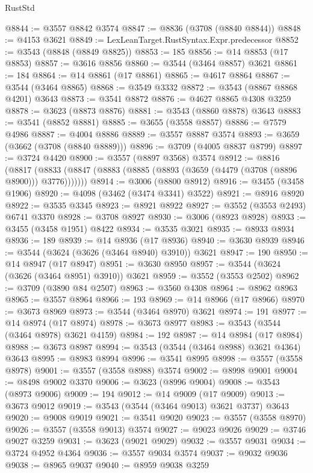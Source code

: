 \begin{lexlean}{RustStd}
\begin{coremodule}
@8844 := @3557 @8842 @3574
@8847 := @8836 (@3708 (@8840 @8844))
@8848 := @4153 @3621
@8849 := LexLeanTarget.RustSyntax.Expr.predecessor
@8852 := @3543 (@8848 (@8849 @8825))
@8853 := 185
@8856 := @14 @8853 (@17 @8853)
@8857 := @3616 @8856
@8860 := @3544 (@3464 @8857) @3621
@8861 := 184
@8864 := @14 @8861 (@17 @8861)
@8865 := @4617 @8864
@8867 := @3544 (@3464 @8865)
@8868 := @3549 @3332
@8872 := @3543 (@8867 @8868 @4201) @3643
@8873 := @3541 @8872
@8876 := @4627 @8865 @4308 @3259
@8878 := @3623 (@8873 @8876)
@8881 := @3543 (@8860 @8878) @3643
@8883 := @3541 (@8852 @8881)
@8885 := @3655 (@3558 @8857)
@8886 := @7579 @4986
@8887 := @4004 @8886
@8889 := @3557 @8887 @3574
@8893 := @3659 (@3662 (@3708 (@8840 @8889)))
@8896 := @3709 (@4005 @8837 @8799)
@8897 := @3724 @4420
@8900 := @3557 (@8897 @3568) @3574
@8912 := @8816
    (@8817 (@8833 (@8847 (@8883 (@8885 (@8893 (@3659 (@4479 (@3708 (@8896 @8900))) @3776)))))))
@8914 := @3006 (@8800 @8912)
@8916 := @3455 (@3458 @1906)
@8920 := @4098 (@3462 (@3474 @3341) @3522)
@8921 := @8916 @8920
@8922 := @3535 @3345
@8923 := @8921 @8922
@8927 := @3552 (@3553 @2493) @6741 @3370
@8928 := @3708 @8927
@8930 := @3006 (@8923 @8928)
@8933 := @3455 (@3458 @1951) @8422
@8934 := @3535 @3021
@8935 := @8933 @8934
@8936 := 189
@8939 := @14 @8936 (@17 @8936)
@8940 := @3630 @8939
@8946 := @3544 (@3624 (@3626 (@3464 @8940) @3910)) @3621
@8947 := 190
@8950 := @14 @8947 (@17 @8947)
@8951 := @3630 @8950
@8957 := @3544 (@3624 (@3626 (@3464 @8951) @3910)) @3621
@8959 := @3552 (@3553 @2502)
@8962 := @3709 (@3890 @84 @2507)
@8963 := @3560 @4308
@8964 := @8962 @8963
@8965 := @3557 @8964
@8966 := 193
@8969 := @14 @8966 (@17 @8966)
@8970 := @3673 @8969
@8973 := @3544 (@3464 @8970) @3621
@8974 := 191
@8977 := @14 @8974 (@17 @8974)
@8978 := @3673 @8977
@8983 := @3543 (@3544 (@3464 @8978) @3621 @4159)
@8984 := 192
@8987 := @14 @8984 (@17 @8984)
@8988 := @3673 @8987
@8994 := @3543 (@3544 (@3464 @8988) @3621 @4364) @3643
@8995 := @8983 @8994
@8996 := @3541 @8995
@8998 := @3557 (@3558 @8978)
@9001 := @3557 (@3558 @8988) @3574
@9002 := @8998 @9001
@9004 := @8498 @9002 @3370
@9006 := @3623 (@8996 @9004)
@9008 := @3543 (@8973 @9006)
@9009 := 194
@9012 := @14 @9009 (@17 @9009)
@9013 := @3673 @9012
@9019 := @3543 (@3544 (@3464 @9013) @3621 @3737) @3643
@9020 := @9008 @9019
@9021 := @3541 @9020
@9023 := @3557 (@3558 @8970)
@9026 := @3557 (@3558 @9013) @3574
@9027 := @9023 @9026
@9029 := @3746 @9027 @3259
@9031 := @3623 (@9021 @9029)
@9032 := @3557 @9031
@9034 := @3724 @4952 @4364
@9036 := @3557 @9034 @3574
@9037 := @9032 @9036
@9038 := @8965 @9037
@9040 := @8959 @9038 @3259

\end{coremodule}
\end{lexlean}
